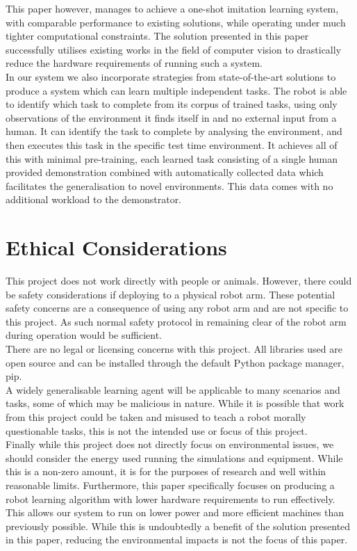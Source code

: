 This paper however, manages to achieve a one-shot imitation learning system, with comparable performance to existing solutions, while operating under much tighter computational constraints. The solution presented in this paper successfully utilises existing works in the field of computer vision to drastically reduce the hardware requirements of running such a system.\\

In our system we also incorporate strategies from state-of-the-art solutions to produce a system which can learn multiple independent tasks. The robot is able to identify which task to complete from its corpus of trained tasks, using only observations of the environment it finds itself in and no external input from a human. It can identify the task to complete by analysing the environment, and then executes this task in the specific test time environment. It achieves all of this with minimal pre-training, each learned task consisting of a single human provided demonstration combined with automatically collected data which facilitates the generalisation to novel environments. This data comes with no additional workload to the demonstrator.

\section{Ethical Considerations}
This project does not work directly with people or animals. However, there could be safety considerations if deploying to a physical robot arm. These potential safety concerns are a consequence of using any robot arm and are not specific to this project. As such normal safety protocol in remaining clear of the robot arm during operation would be sufficient.\\
There are no legal or licensing concerns with this project. All libraries used are open source and can be installed through the default Python package manager, pip.\\
A widely generalisable learning agent will be applicable to many scenarios and tasks, some of which may be malicious in nature. While it is possible that work from this project could be taken and misused to teach a robot morally questionable tasks, this is not the intended use or focus of this project.\\
Finally while this project does not directly focus on environmental issues, we should consider the energy used running the simulations and equipment. While this is a non-zero amount, it is for the purposes of research and well within reasonable limits. Furthermore, this paper specifically focuses on producing a robot learning algorithm with lower hardware requirements to run effectively. This allows our system to run on lower power and more efficient machines than previously possible. While this is undoubtedly a benefit of the solution presented in this paper, reducing the environmental impacts is not the focus of this paper.